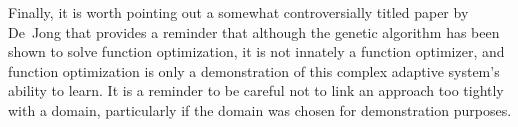 Finally, it is worth pointing out a somewhat controversially titled paper by De~Jong \cite{Jong1992} that provides a reminder that although the genetic algorithm has been shown to solve function optimization, it is not innately a function optimizer, and  function optimization is only a demonstration of this complex adaptive system's ability to learn. It is a reminder to be careful not to link an approach too tightly with a domain, particularly if the domain was chosen for demonstration purposes.
